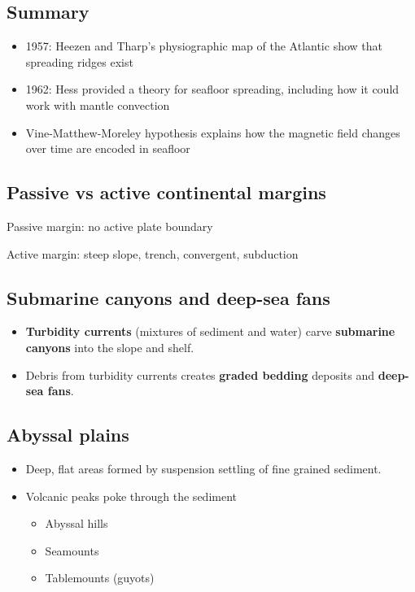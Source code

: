 \subsection{Summary}

\begin{itemize}
    \item 1957: Heezen and Tharp's physiographic map of the Atlantic show that
        spreading ridges exist
    \item 1962: Hess provided a theory for seafloor spreading, including how
        it could work with mantle convection
    \item Vine-Matthew-Moreley hypothesis explains how the magnetic field
        changes over time are encoded in seafloor
\end{itemize}

\subsection{Passive vs active continental margins}

Passive margin: no active plate boundary

Active margin: steep slope, trench, convergent, subduction

\subsection{Submarine canyons and deep-sea fans}

\begin{itemize}
    \item \textbf{Turbidity currents} (mixtures of sediment and water)
        carve \textbf{submarine canyons} into the slope and shelf.
    \item Debris from turbidity currents creates \textbf{graded bedding}
        deposits and \textbf{deep-sea fans}.
\end{itemize}

\subsection{Abyssal plains}

\begin{itemize}
    \item Deep, flat areas formed by suspension settling of fine grained
        sediment.
    \item Volcanic peaks poke through the sediment
        \begin{itemize}
            \item Abyssal hills
            \item Seamounts
            \item Tablemounts (guyots)
        \end{itemize}
\end{itemize}

